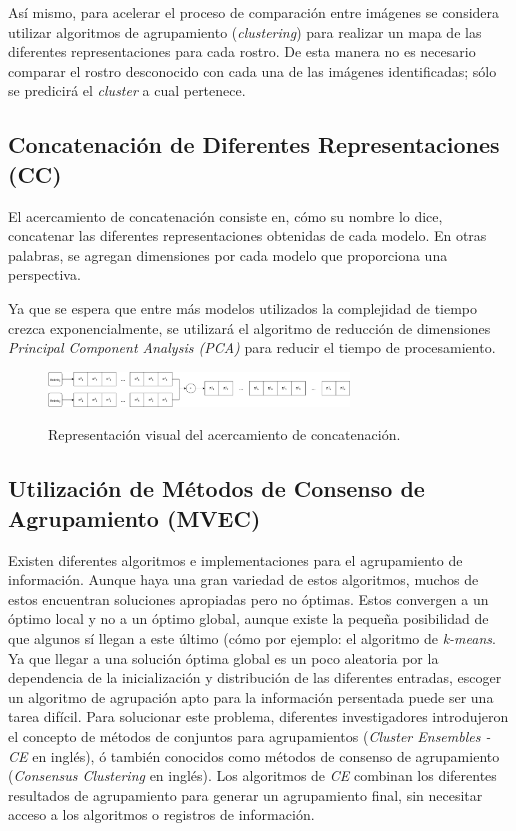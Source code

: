 \documentclass[letterpaper, 10 pt, conference]{ieeeconf}  %
\begin{document}
    Así mismo, para acelerar el proceso de comparación entre imágenes se considera utilizar
    algoritmos de agrupamiento (\textit{clustering}) para realizar un mapa de las diferentes
    representaciones para cada rostro. De esta manera no es necesario comparar el rostro
    desconocido con cada una de las imágenes identificadas; sólo se predicirá el \textit{cluster} a
    cual pertenece.

    \subsection{Concatenación de Diferentes Representaciones (CC)}
    El acercamiento de concatenación consiste en, cómo su nombre lo dice, concatenar las
    diferentes representaciones obtenidas de cada modelo. En otras palabras, se agregan dimensiones
    por cada modelo que proporciona una perspectiva.
    
    Ya que se espera que entre más modelos utilizados la complejidad de tiempo crezca
    exponencialmente, se utilizará el algoritmo de reducción de dimensiones
    \textit{Principal Component Analysis (PCA)} para reducir el tiempo de procesamiento.

    \begin{figure}[ht]
        \centering
        \includegraphics[width=8cm]{./figs/cc.png}
        \label{fig: Concatenación}
        \caption{Representación visual del acercamiento de concatenación.}
    \end{figure}

    \subsection{Utilización de Métodos de Consenso de Agrupamiento (MVEC)}
    Existen diferentes algoritmos e implementaciones para el agrupamiento de información. Aunque
    haya una gran variedad de estos algoritmos, muchos de estos encuentran soluciones apropiadas
    pero no óptimas. Estos convergen a un óptimo local y no a un óptimo global, aunque existe
    la pequeña posibilidad de que algunos sí llegan a este último (cómo por ejemplo: el algoritmo
    de \textit{k-means}. Ya que llegar a una solución óptima global es un poco aleatoria por la
    dependencia de la inicialización y distribución de las diferentes entradas, escoger un
    algoritmo de agrupación apto para la información persentada puede ser una tarea difícil. Para
    solucionar este problema, diferentes investigadores introdujeron el concepto de métodos de
    conjuntos para agrupamientos (\textit{Cluster Ensembles - CE} en inglés), ó también conocidos
    como métodos de consenso de agrupamiento (\textit{Consensus Clustering} en inglés). Los
    algoritmos de \textit{CE} combinan los diferentes resultados de agrupamiento para generar un
    agrupamiento final, sin necesitar acceso a los algoritmos o registros de información.
    \cite{Golalipour2021}
\end{document}
